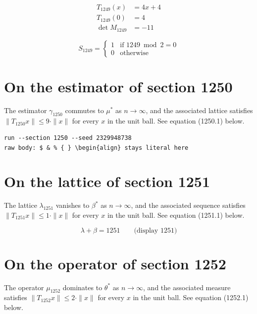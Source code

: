 \documentclass{article}
\begin{document}
\begin{align}
T_{1249}(x) &= 4 x + 4 \\
T_{1249}(0) &= 4 \\
\det M_{1249} &= -11
\end{align}

\begin{equation}
S_{1249} = \begin{cases} 1 & \text{if } 1249 \bmod 2 = 0 \\ 0 & \text{otherwise} \end{cases}
\end{equation}

\section{On the estimator of section 1250}
The estimator $\gamma_{1250}$ commutes to $\mu^{*}$ as $n \to \infty$,
and the associated lattice satisfies $\|T_{1250} x\| \leq 9 \cdot \|x\|$
for every $x$ in the unit ball. See equation (1250.1) below.

\begin{verbatim}
run --section 1250 --seed 2329948738
raw body: $ & % { } \begin{align} stays literal here
\end{verbatim}

\section{On the lattice of section 1251}
The lattice $\lambda_{1251}$ vanishes to $\beta^{*}$ as $n \to \infty$,
and the associated sequence satisfies $\|T_{1251} x\| \leq 1 \cdot \|x\|$
for every $x$ in the unit ball. See equation (1251.1) below.

$$
\lambda + \beta = 1251 \qquad \text{(display 1251)}
$$

\section{On the operator of section 1252}
The operator $\mu_{1252}$ dominates to $\theta^{*}$ as $n \to \infty$,
and the associated measure satisfies $\|T_{1252} x\| \leq 2 \cdot \|x\|$
for every $x$ in the unit ball. See equation (1252.1) below.
\end{document}
